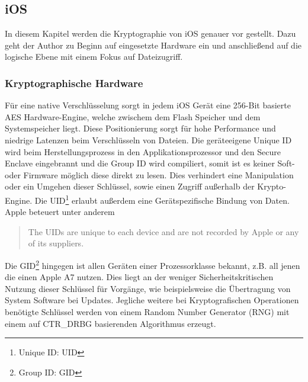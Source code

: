 \subsection{iOS}
	In diesem Kapitel werden die Kryptographie von iOS genauer vor gestellt.
	Dazu geht der Author zu Beginn auf eingesetzte Hardware ein und anschließend
	auf die logische Ebene mit einem Fokus auf Dateizugriff.
	\subsubsection{Kryptographische Hardware}\label{sec:crypto-engine}
		Für eine native Verschlüsselung sorgt in jedem iOS Gerät eine 256-Bit
		basierte AES Hardware-Engine, welche zwischem dem Flash	Speicher und dem
		Systemspeicher liegt. Diese Positionierung sorgt für hohe Performance und
		niedrige Latenzen beim Verschlüsseln von Dateien. Die geräteeigene Unique ID
		wird beim Herstellungsprozess in den Applikationsprozessor und den Secure
		Enclave eingebrannt und die Group ID wird compiliert, somit ist es keiner
		Soft- oder Firmware möglich diese direkt zu lesen. Dies verhindert eine
		Manipulation oder ein Umgehen dieser Schlüssel, sowie einen Zugriff außerhalb
		der Krypto-Engine. Die UID\footnote{Unique ID: UID} erlaubt außerdem eine
		Gerätspezifische Bindung von Daten. Apple beteuert unter anderem
		\begin{quote}
			The UIDs are unique to each device and are not recorded by Apple or any of its
			suppliers.\cite[S.9]{iOSSecurityApr2015}
		\end{quote}
		Die GID\footnote{Group ID: GID} hingegen ist allen Geräten einer
		Prozessorklasse bekannt, z.B.
		all jenen die einen Apple A7 nutzen. Dies liegt an der weniger
		Sicherheitskritischen Nutzung dieser Schlüssel für Vorgänge,
		wie beispielsweise die Übertragung von System Software bei Updates. Jegliche
		weitere bei Kryptografischen Operationen benötigte Schlüssel werden von einem
		Random Number Generator (RNG) mit einem auf	CTR\_DRBG\cite{NISTDRBG2012}
		basierenden Algorithmus erzeugt.
